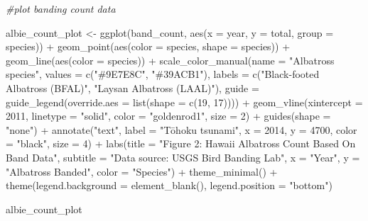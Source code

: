 \documentclass[
]{article}
\newenvironment{Shaded}{\begin{snugshade}}{\end{snugshade}}
\newcommand{\AttributeTok}[1]{\textcolor[rgb]{0.77,0.63,0.00}{#1}}
\newcommand{\CommentTok}[1]{\textcolor[rgb]{0.56,0.35,0.01}{\textit{#1}}}
\newcommand{\DecValTok}[1]{\textcolor[rgb]{0.00,0.00,0.81}{#1}}
\newcommand{\FunctionTok}[1]{\textcolor[rgb]{0.00,0.00,0.00}{#1}}
\newcommand{\NormalTok}[1]{#1}
\newcommand{\OtherTok}[1]{\textcolor[rgb]{0.56,0.35,0.01}{#1}}
\newcommand{\SpecialCharTok}[1]{\textcolor[rgb]{0.00,0.00,0.00}{#1}}
\newcommand{\StringTok}[1]{\textcolor[rgb]{0.31,0.60,0.02}{#1}}
\begin{document}
\begin{Shaded}
\begin{Highlighting}[]
\CommentTok{\#plot banding count data}

\NormalTok{albie\_count\_plot }\OtherTok{\textless{}{-}} \FunctionTok{ggplot}\NormalTok{(band\_count, }\FunctionTok{aes}\NormalTok{(}\AttributeTok{x =}\NormalTok{ year, }\AttributeTok{y =}\NormalTok{ total, }\AttributeTok{group =}\NormalTok{ species)) }\SpecialCharTok{+}
  \FunctionTok{geom\_point}\NormalTok{(}\FunctionTok{aes}\NormalTok{(}\AttributeTok{color =}\NormalTok{ species,}
                 \AttributeTok{shape =}\NormalTok{ species)) }\SpecialCharTok{+}
  \FunctionTok{geom\_line}\NormalTok{(}\FunctionTok{aes}\NormalTok{(}\AttributeTok{color =}\NormalTok{ species)) }\SpecialCharTok{+}
  \FunctionTok{scale\_color\_manual}\NormalTok{(}\AttributeTok{name =} \StringTok{"Albatross species"}\NormalTok{,}
                     \AttributeTok{values =} \FunctionTok{c}\NormalTok{(}\StringTok{"\#9E7E8C"}\NormalTok{, }\StringTok{"\#39ACB1"}\NormalTok{),}
                     \AttributeTok{labels =} \FunctionTok{c}\NormalTok{(}\StringTok{"Black{-}footed Albatross (BFAL)"}\NormalTok{, }\StringTok{"Laysan Albatross (LAAL)"}\NormalTok{),}
                     \AttributeTok{guide =} \FunctionTok{guide\_legend}\NormalTok{(}\AttributeTok{override.aes =} \FunctionTok{list}\NormalTok{(}\AttributeTok{shape =} \FunctionTok{c}\NormalTok{(}\DecValTok{19}\NormalTok{, }\DecValTok{17}\NormalTok{)))) }\SpecialCharTok{+}
  \FunctionTok{geom\_vline}\NormalTok{(}\AttributeTok{xintercept =} \DecValTok{2011}\NormalTok{,}
             \AttributeTok{linetype =} \StringTok{"solid"}\NormalTok{,}
             \AttributeTok{color =} \StringTok{"goldenrod1"}\NormalTok{,}
             \AttributeTok{size =} \DecValTok{2}\NormalTok{) }\SpecialCharTok{+}
  \FunctionTok{guides}\NormalTok{(}\AttributeTok{shape =} \StringTok{"none"}\NormalTok{) }\SpecialCharTok{+}
  \FunctionTok{annotate}\NormalTok{(}\StringTok{"text"}\NormalTok{,}
           \AttributeTok{label =} \StringTok{"Tōhoku tsunami"}\NormalTok{,}
           \AttributeTok{x =} \DecValTok{2014}\NormalTok{,}
           \AttributeTok{y =} \DecValTok{4700}\NormalTok{,}
           \AttributeTok{color =} \StringTok{"black"}\NormalTok{,}
           \AttributeTok{size =} \DecValTok{4}\NormalTok{) }\SpecialCharTok{+}
  \FunctionTok{labs}\NormalTok{(}\AttributeTok{title =} \StringTok{"Figure 2: Hawaii Albatross Count Based On Band Data"}\NormalTok{,}
       \AttributeTok{subtitle =} \StringTok{"Data source: USGS Bird Banding Lab"}\NormalTok{,}
       \AttributeTok{x =} \StringTok{"Year"}\NormalTok{,}
       \AttributeTok{y =} \StringTok{"Albatross Banded"}\NormalTok{,}
       \AttributeTok{color =} \StringTok{"Species"}\NormalTok{) }\SpecialCharTok{+}
  \FunctionTok{theme\_minimal}\NormalTok{() }\SpecialCharTok{+}
  \FunctionTok{theme}\NormalTok{(}\AttributeTok{legend.background =} \FunctionTok{element\_blank}\NormalTok{(),}
        \AttributeTok{legend.position =} \StringTok{"bottom"}\NormalTok{)  }
  
\NormalTok{albie\_count\_plot}
\end{Highlighting}
\end{Shaded}
\end{document}
